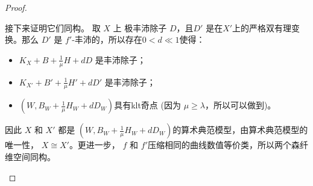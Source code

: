 \begin{proof}
\begin{enumerate}
接下来证明它们同构。 取 $X$ 上  极丰沛除子 $ D $，且$D'  $ 是在$ X' $上的严格双有理变换。那么  $ D' $ 是 $ f' $-丰沛的，所以存在$ 0<d\ll1 $使得：
          \begin{itemize}
            \item $ K_X+B+\frac{1}{\mu }H+dD $ 是丰沛除子；
            \item $ K_{X'}+B'+\frac{1}{\mu }H'+dD' $ 是丰沛除子；
            \item $(W,B_{W}+\frac{1}{\mu}H_{W}+dD_{W})$具有klt奇点 (因为 $\mu \geqslant \lambda$，所以可以做到)。
          \end{itemize}
          因此 $X$ 和 $X'$ 都是 $(W,B_{W}+\frac{1}{\mu}H_{W}+dD_{W})$的算术典范模型，由算术典范模型的唯一性， $X\cong X'$。更进一步， $f$ 和  $f'$压缩相同的曲线数值等价类，所以两个森纤维空间同构。
  \end{enumerate}
\end{proof}

